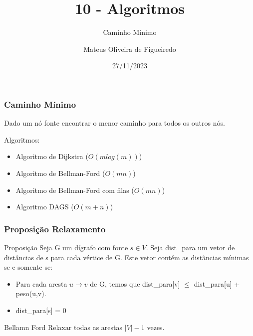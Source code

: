 \documentclass[aspectratio=169,usenames,dvipsnames]{beamer}
\title{10 - Algoritmos}
\subtitle{Caminho Mínimo}
\author{Mateus Oliveira de Figueiredo}
\date{27/11/2023}
\begin{document}
\begin{frame}
\titlepage
\end{frame}

\begin{frame}
\frametitle{Caminho Mínimo}

Dado um nó fonte encontrar o menor caminho para todos os outros nós.

\vfill
Algoritmos:
\begin{itemize}
  \item Algoritmo de Dijkstra ($O(mlog(m))$)
  \item Algoritmo de Bellman-Ford ($O(mn)$)
  \item Algoritmo de Bellman-Ford com filas ($O(mn)$)
  \item Algoritmo DAGS ($O(m+n)$)
\end{itemize}
\vfill
\end{frame}


\begin{frame}
\frametitle{Proposição Relaxamento}

\vfill
\begin{block}{Proposição}
Seja G um dígrafo com fonte $s \in V$. Seja dist\_para um vetor de distâncias de s para cada vértice de G. 
Este vetor contém as distâncias mínimas se e somente se:
\begin{itemize}
  \item Para cada aresta $u \rightarrow v$ de G, temos que dist\_para[v] $\leq$ dist\_para[u] + peso(u,v).
  \item dist\_para[s] = 0
\end{itemize}
\end{block}
\vfill

\end{frame}

\begin{frame}{Bellamn Ford}
    Relaxar todas as arestas $|V|-1$ vezes.

\end{frame}
\end{document}

